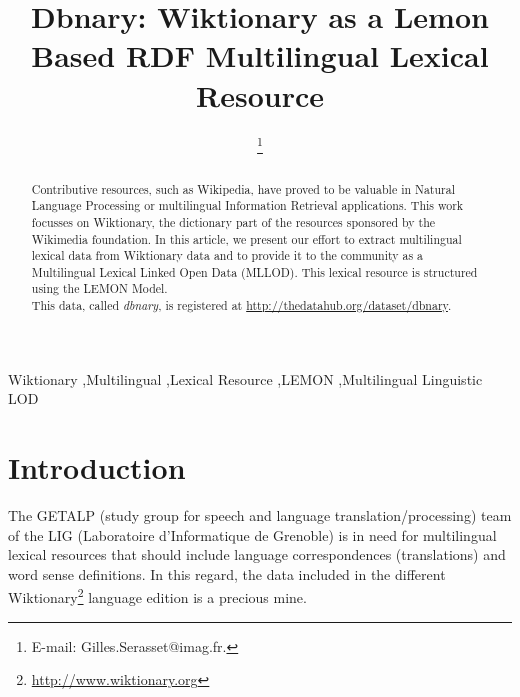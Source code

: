 \documentclass[sw]{iosart2c}
\begin{document}
\begin{frontmatter}

\title{Dbnary: Wiktionary as a Lemon Based RDF Multilingual Lexical Resource}



\author{ \thanks{E-mail: Gilles.Serasset@imag.fr.}}
\address{GETALP-LIG, UJF-Grenoble 1 \\BP 53, 38051 Grenoble cedex 9, France\\ \texttt{gilles.serasset@imag.fr}}


\begin{abstract}
Contributive resources, such as Wikipedia, have proved to be valuable in Natural Language Processing or multilingual Information Retrieval applications. This work focusses on Wiktionary, the dictionary part of the resources sponsored by the Wikimedia foundation. In this article, we present our effort to extract multilingual lexical data from Wiktionary data and to provide it to the community as a Multilingual Lexical Linked Open Data (MLLOD). This lexical resource is structured using the LEMON Model.\\
This data, called \textit{dbnary}, is registered at \url{http://thedatahub.org/dataset/dbnary}.
\end{abstract}

\begin{keyword}
Wiktionary \sep Multilingual \sep Lexical Resource \sep LEMON \sep Multilingual Linguistic LOD
\end{keyword}

\end{frontmatter}

\section{Introduction}

The GETALP (study group for speech and language translation/processing) team of the LIG (Laboratoire d'Informatique de Grenoble) is in need for multilingual lexical resources that should include language correspondences (translations) and word sense definitions. In this regard, the data included in the different Wiktionary\footnote{\url{http://www.wiktionary.org}} language edition is a precious mine.
\end{document}
